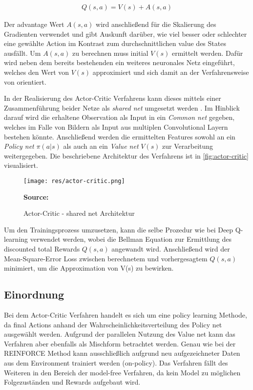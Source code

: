 \documentclass[11pt]{scrartcl}
\newcommand{\source}[1]{\vspace{-5pt} \caption*{\hfill \textbf{Source:} {#1}} }
\begin{document}
\begin{align}
Q(s,a)=V(s)+A(s,a)
\label{aln:actor-critic-advantage}
\end{align}

Der advantage Wert $A(s,a)$ wird anschließend für die Skalierung des Gradienten verwendet und gibt Auskunft
darüber, wie viel besser oder schlechter eine gewählte Action im Kontrast zum durchschnittlichen value des
States ausfällt. Um $A(s,a)$ zu berechnen muss initial $V(s)$ ermittelt werden. Dafür wird neben dem bereits
bestehenden ein weiteres neuronales Netz eingeführt, welches den Wert von $V(s)$ approximiert und sich damit
an der Verfahrensweise von  orientiert.

In der Realisierung des Actor-Critic Verfahrens kann dieses mittels einer Zusammenführung beider Netze als
\textit{shared net} umgesetzt werden  \cite[~S.269]{L2018}. Im Hinblick darauf wird die erhaltene
Observation als Input in ein \textit{Common net} gegeben, welches im Falle von Bildern als Input aus
multiplen Convolutional Layern bestehen könnte. Anschließend werden die ermittelten Features sowohl an
ein \textit{Policy net} $\pi(a|s)$ als auch an ein \textit{Value net} $V(s)$ zur Verarbeitung
weitergegeben. Die beschriebene Architektur des Verfahrens ist in \autoref{fig:actor-critic}
visualisiert.

\begin{figure}[htp]
\centering
\texttt{[image: res/actor-critic.png]}
\caption{Actor-Critic - shared net Architektur}
\source{\cite[~S.268 - Chapter 10 - Figure 5]{L2018}}
\label{fig:actor-critic}
\end{figure}

Um den Trainingsprozess umzusetzen, kann die selbe Prozedur wie bei Deep Q-learning verwendet werden, wobei
die Bellman Equation zur Ermittlung des discounted total Rewards $Q(s,a)$ angewandt wird. Anschließend wird
der Mean-Square-Error Loss zwischen berechnetem und vorhergesagtem $Q(s,a)$ minimiert, um die Approximation
von V(s) zu bewirken.


\subsection{Einordnung}
Bei dem Actor-Critic Verfahren handelt es sich um eine policy learning Methode, da final Actions anhand der
Wahrscheinlichkeitsverteilung des Policy net ausgewählt werden. Aufgrund der parallelen Nutzung des Value
net kann das Verfahren aber ebenfalls als Mischform betrachtet werden. Genau wie bei der REINFORCE Method
kann ausschließlich aufgrund neu aufgezeichneter Daten aus dem Environment trainiert werden (on-policy).
Das Verfahren fällt des Weiteren in den Bereich der model-free Verfahren, da kein Model zu möglichen
Folgezuständen und Rewards aufgebaut wird. 
\end{document}
